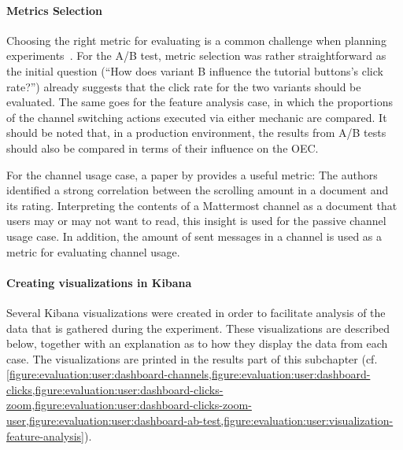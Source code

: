 \paragraph{Metrics Selection}

Choosing the right metric for evaluating is a common challenge when planning experiments~\cite{lindgren2015software}.
For the A/B test, metric selection was rather straightforward as the initial question (``How does variant B influence the tutorial buttons's click rate?'') already suggests that the click rate for the two variants should be evaluated.
The same goes for the feature analysis case, in which the proportions of the channel switching actions executed via either mechanic are compared.
It should be noted that, in a production environment, the results from A/B tests should also be compared in terms of their influence on the \acf{OEC}.

For the channel usage case, a paper by \citet{Claypool2001} provides a useful metric: The authors identified a strong correlation between the scrolling amount in a document and its rating.
Interpreting the contents of a Mattermost channel as a document that users may or may not want to read, this insight is used for the passive channel usage case.
In addition, the amount of sent messages in a channel is used as a metric for evaluating channel usage.




\paragraph{Creating visualizations in Kibana}

Several Kibana visualizations were created in order to facilitate analysis of the data that is gathered during the experiment.
These visualizations are described below, together with an explanation as to how they display the data from each case.
The visualizations are printed in the results part of this subchapter (cf. \cref{figure:evaluation:user:dashboard-channels,figure:evaluation:user:dashboard-clicks,figure:evaluation:user:dashboard-clicks-zoom,figure:evaluation:user:dashboard-clicks-zoom-user,figure:evaluation:user:dashboard-ab-test,figure:evaluation:user:visualization-feature-analysis}).

